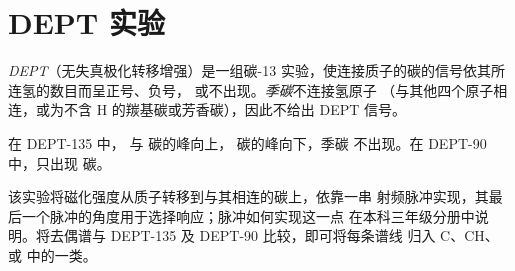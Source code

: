 \section{DEPT 实验}

\begin{definition}[DEPT 实验]\label{def:b2:structure-determination:dept}
\emph{DEPT}（无失真极化转移增强）是一组碳-13
实验，使连接质子的碳的信号依其所连氢的数目而呈正号、负号，
或不出现。\emph{季碳}不连接氢原子
（与其他四个原子相连，或为不含 H 的羰基碳或芳香碳），因此不给出 DEPT 信号。
\end{definition}

\begin{proposition}\label{prop:b2:structure-determination:dept}
在 DEPT-135 中， 与  碳的峰向上， 碳的峰向下，季碳
不出现。在 DEPT-90 中，只出现  碳。
\end{proposition}

\admitted

该实验将磁化强度从质子转移到与其相连的碳上，依靠一串
射频脉冲实现，其最后一个脉冲的角度用于选择响应；脉冲如何实现这一点
在本科三年级分册中说明。将去偶谱与 DEPT-135 及 DEPT-90 比较，即可将每条谱线
归入 C、CH、 或  中的一类。

